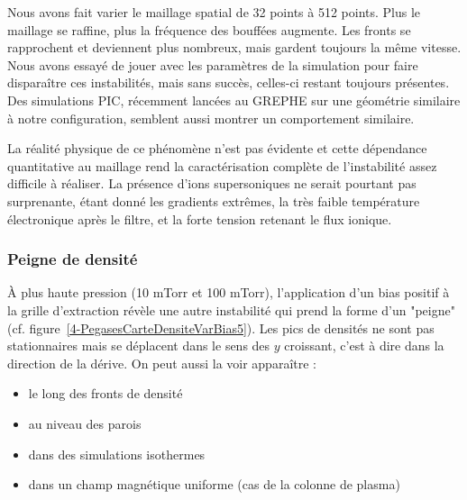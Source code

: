 \begin{refsection}
Nous avons fait varier le maillage spatial de 32 points à 512
points. Plus le maillage se raffine, plus la fréquence des bouffées augmente.
Les fronts se rapprochent et deviennent plus nombreux, mais gardent toujours la
même vitesse. Nous avons essayé de jouer avec les paramètres de la simulation
pour faire disparaître ces instabilités, mais sans succès, celles-ci
restant toujours présentes.
Des simulations PIC, récemment lancées au GREPHE sur une géométrie similaire
à notre configuration, semblent aussi montrer un comportement similaire.

La réalité physique de
ce phénomène n'est pas évidente et cette
dépendance quantitative au maillage rend la caractérisation complète de
l'instabilité assez difficile à réaliser.  
La présence d'ions supersoniques ne serait
pourtant pas surprenante, étant donné les gradients extrêmes, la très faible
température électronique après le filtre, et la forte tension retenant le flux
ionique.

	\subsubsection{Peigne de densité}
	À plus haute pression (10 mTorr et 100 mTorr), l'application d'un bias positif
	à la grille d'extraction révèle une autre instabilité qui prend la forme d'un
	"peigne" (cf.
	figure~\ref{4-PegasesCarteDensiteVarBias5}). Les pics de densités ne sont pas
	stationnaires mais se déplacent dans le sens des $y$ croissant, c'est à dire
	dans la direction de la dérive.
	On peut aussi la voir apparaître :
	
	\begin{itemize}
	  \item le long des fronts de densité
	  \item au niveau des parois
	  \item dans des simulations isothermes
	  \item dans un champ magnétique uniforme (cas de la colonne de plasma)
	\end{itemize}


\end{refsection}

